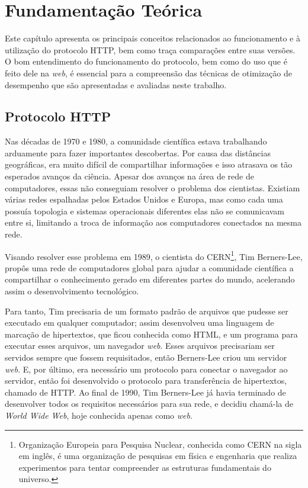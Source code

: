 %
%

\chapter{Fundamentação Teórica}
\label{chap:fundamentacaoTeorica}

Este capítulo apresenta os principais conceitos relacionados ao funcionamento e à utilização do protocolo HTTP, bem como traça comparações entre suas versões. O bom entendimento do funcionamento do protocolo, bem como do uso que é feito dele na \textit{web}, é essencial para a compreensão das técnicas de otimização de desempenho que são apresentadas e avaliadas neste trabalho.

\section{Protocolo HTTP}
\label{sec:http}

Nas décadas de 1970 e 1980, a comunidade científica estava trabalhando arduamente para fazer importantes descobertas. Por causa das distâncias geográficas, era muito difícil de compartilhar informações e isso atrasava os tão esperados avanços da ciência. Apesar dos avanços na área de rede de computadores, essas não conseguiam resolver o problema dos cientistas. Existiam várias redes espalhadas pelos Estados Unidos e Europa, mas como cada uma possuía topologia e sistemas operacionais diferentes elas não se comunicavam entre si, limitando a troca de informação aos computadores conectados na mesma rede.

Visando resolver esse problema em 1989, o cientista do CERN\footnote{Organização Europeia para Pesquisa Nuclear, conhecida como CERN na sigla em inglês, é uma organização de pesquisas em física e engenharia que realiza experimentos para tentar compreender as estruturas fundamentais do universo.}, Tim Berners-Lee, propôs uma rede de computadores global para ajudar a comunidade científica a compartilhar o conhecimento gerado em diferentes partes do mundo, acelerando assim o desenvolvimento tecnológico.

Para tanto, Tim precisaria de um formato padrão de arquivos que pudesse ser executado em qualquer computador; assim desenvolveu uma linguagem de marcação de hipertextos,  que ficou conhecida como HTML, e um programa para executar esses arquivos, um navegador \textit{web}. Esses arquivos precisariam ser servidos sempre que fossem requisitados, então Berners-Lee criou um servidor \textit{web}. E, por último, era necessário um protocolo para conectar o navegador ao servidor, então foi desenvolvido o protocolo para transferência de hipertextos, chamado de HTTP. Ao final de 1990, Tim Berners-Lee já havia terminado de desenvolver todos os requisitos necessários para sua rede, e decidiu chamá-la de \textit{World Wide Web}, hoje conhecida apenas como \textit{web}.

